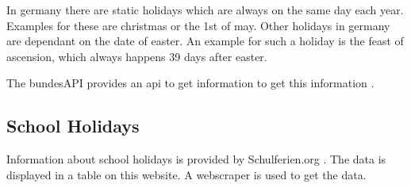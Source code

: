 \documentclass[class=scrbook, crop=false]{standalone}
\begin{document}
In germany there are static holidays which are always on the same day each year.
Examples for these are christmas or the 1st of may. 
Other holidays in germany are dependant on the date of easter. 
An example for such a holiday is the feast of ascension, which always happens 39 days after easter.

The bundesAPI provides an api to get information to get this information \cite{HolidayAPIUrl}.

\subsection{School Holidays}

Information about school holidays is provided by Schulferien.org \cite{SchoolHolidays}. 
The data is displayed in a table on this website. 
A webscraper is used to get the data.
\end{document}
